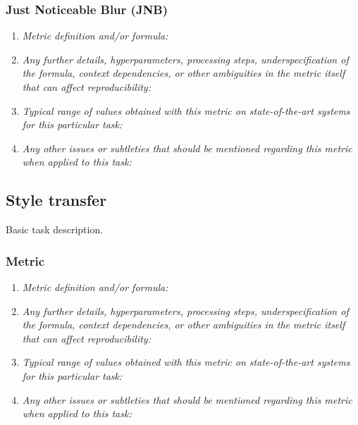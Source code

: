 \documentclass[a4paper,11pt]{article}
\begin{document}
        \subsubsection{Just Noticeable Blur (JNB)}
            \begin{enumerate}[label=\alph*.]
                \item \textit{Metric definition and/or formula:}
                \bigskip
                \item \textit{Any further details, hyperparameters, processing steps, underspecification of the formula, context dependencies, or other ambiguities in the metric itself that can affect reproducibility:}
                \bigskip
                \item \textit{Typical range of values obtained with this metric on state-of-the-art systems for this particular task:}
                \bigskip
                \item \textit{Any other issues or subtleties that should be mentioned regarding this metric when applied to this task:}
                \bigskip
            \end{enumerate}

    \subsection{Style transfer}
        Basic task description.
        \subsubsection{Metric}
            \begin{enumerate}[label=\alph*.]
                \item \textit{Metric definition and/or formula:}
                \bigskip
                \item \textit{Any further details, hyperparameters, processing steps, underspecification of the formula, context dependencies, or other ambiguities in the metric itself that can affect reproducibility:}
                \bigskip
                \item \textit{Typical range of values obtained with this metric on state-of-the-art systems for this particular task:}
                \bigskip
                \item \textit{Any other issues or subtleties that should be mentioned regarding this metric when applied to this task:}
                \bigskip
            \end{enumerate}
\end{document}
